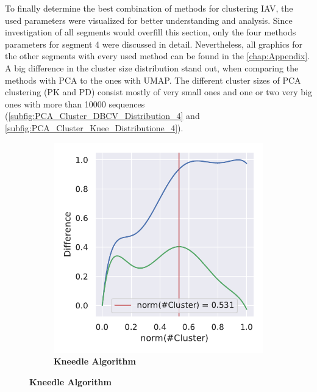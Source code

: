 To finally determine the best combination of methods for clustering \gls{IAV}, the used parameters were visualized for better understanding and analysis. Since investigation of all segments would overfill this section, only the four methods parameters for segment 4 were discussed in detail. Nevertheless, all graphics for the other segments with every used method can be found in the \autoref{chap:Appendix}. A big difference in the cluster size distribution stand out, when comparing the methods with \gls{PCA} to the ones with \gls{UMAP}. The different cluster sizes of \gls{PCA} clustering (PK and PD) consist mostly of very small ones and one or two very big ones with more than 10000 sequences (\autoref{subfig:PCA_Cluster_DBCV_Distribution_4} and \autoref{subfig:PCA_Cluster_Knee_Distributione_4}). 

\begin{figure}[!hbt]
    \centering
    \begin{subfigure}[b]{0.475\textwidth}
        \caption[Kneedle Algorithm]{\textbf{Kneedle Algorithm}}
        \label{subfig:UMAP_Cluster_Knee_Kneedle_4}            \includegraphics[width=\textwidth]{UMAP/Cluster_Knee_Segment_4.pdf}
    \end{subfigure}
    \hfill

\end{figure}
